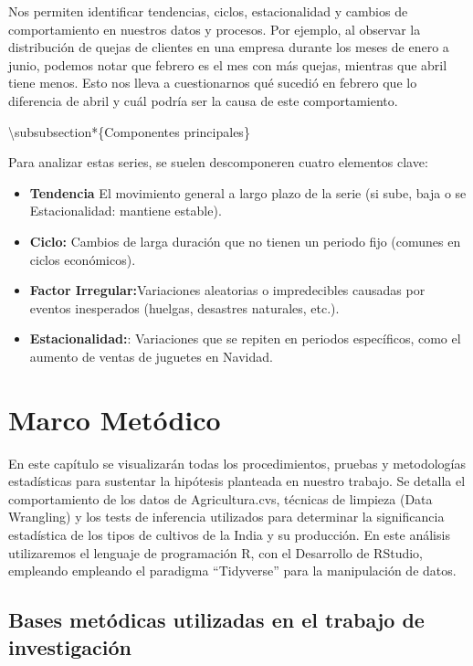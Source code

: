 \documentclass[oneside,11pt]{Latex/Classes/PhDthesisPSnPDF}
\begin{document}
Nos permiten identificar tendencias, ciclos, estacionalidad y cambios de
comportamiento en nuestros datos y procesos. Por ejemplo, al observar la
distribución de quejas de clientes en una empresa durante los meses de
enero a junio, podemos notar que febrero es el mes con más quejas,
mientras que abril tiene menos. Esto nos lleva a cuestionarnos qué
sucedió en febrero que lo diferencia de abril y cuál podría ser la causa
de este comportamiento.

\textbackslash subsubsection*\{Componentes principales\}

Para analizar estas series, se suelen descomponeren cuatro elementos
clave:

\begin{itemize}
 \item{\textbf{Tendencia} El movimiento general a largo plazo de la serie (si sube, baja o se Estacionalidad: mantiene estable). }
 \item{\textbf{Ciclo:} Cambios de larga duración que no tienen un periodo fijo (comunes en ciclos económicos).}
 \item{\textbf{Factor Irregular:}Variaciones aleatorias o impredecibles causadas por eventos inesperados (huelgas, desastres naturales, etc.). }
 \item{\textbf{Estacionalidad:}:  Variaciones  que se repiten en periodos específicos, como el aumento de ventas de juguetes en Navidad.}
\end{itemize}

\hfill\break

\chapter{Marco Metódico}

En este capítulo se visualizarán todas los procedimientos, pruebas y
metodologías estadísticas para sustentar la hipótesis planteada en
nuestro trabajo. Se detalla el comportamiento de los datos de
Agricultura.cvs, técnicas de limpieza (Data Wrangling) y los tests de
inferencia utilizados para determinar la significancia estadística de
los tipos de cultivos de la India y su producción. En este análisis
utilizaremos el lenguaje de programación R, con el Desarrollo de
RStudio, empleando empleando el paradigma ``Tidyverse'' para la
manipulación de datos.\\

\section{Bases metódicas utilizadas en el trabajo de investigación}
\end{document}
